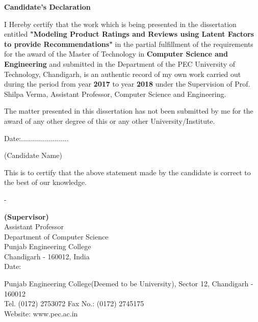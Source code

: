 \documentclass[a4paper]{article}
\begin{document}
\vspace*{5px}
    \begin{figure}[h]
        {\par}
    \end{figure}
\justify
\begin{large}
\begin{center}
\textbf{Candidate's Declaration}
\end{center}


I Hereby  certify  that  the  work  which  is  being  presented  in  the dissertation entitled \textbf{"Modeling Product Ratings and Reviews using Latent Factors to provide Recommendations"} in  the partial fulfillment of the requirements for the award of the Master of Technology in \textbf{Computer Science and Engineering} and submitted in the Department of the PEC University of Technology, Chandigarh, is  an  authentic record of my own work carried out during the period from year \textbf{2017} to year \textbf{2018} under the Supervision of Prof. Shilpa Verma, Assistant Professor, Computer Science and Engineering. \par
The  matter  presented  in  this dissertation has  not  been  submitted  by  me  for  the  award  of  any other degree of this or any other University/Institute. \par


\begin{minipage}{0.5\textwidth}
Date:........................
\end{minipage}%
\begin{minipage}{0.5\textwidth}
(Candidate Name)
\end{minipage}

This  is  to  certify  that  the  above  statement  made  by  the  candidate  is  correct  to  the  best  of  our knowledge.

\vspace*{25px}
\begin{minipage}{0.5\textwidth}
-
\end{minipage}%
\begin{minipage}{0.5\textwidth}
\textbf{(Supervisor)}\\
Assistant Professor\\
Department of Computer Science\\
Punjab Engineering College\\
Chandigarh - 160012, India\\
Date: 
\end{minipage}

\vfill


\begin{center}
{\color{gray}
Punjab Engineering College(Deemed to be University), Sector 12, Chandigarh - 160012\\
Tel. (0172) 2753072 Fax No.: (0172) 2745175\\
Website: www.pec.ac.in}
\end{center}


\end{large}
\end{document}

